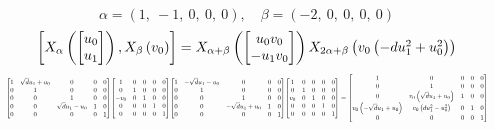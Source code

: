 \documentclass[11pt]{article}
\theoremstyle{definition}
\begin{document}
\[
\alpha = \left( 1, \  -1, \  0, \  0, \  0\right), \quad \beta = \left( -2, \  0, \  0, \  0, \  0\right)
\]
\[
\scaletoalign{\textwidth}{\left[ X_{\alpha}\left(\left[\begin{matrix}u_{0}\\u_{1}\end{matrix}\right]\right), X_{\beta}\left(v_{0}\right) \right] = X_{\alpha + \beta}\left(\left[\begin{matrix}u_{0} v_{0}\\- u_{1} v_{0}\end{matrix}\right]\right) X_{2\alpha + \beta}\left(v_{0} \left(- d u_{1}^{2} + u_{0}^{2}\right)\right)}
\]
\[
\scaletoalign{\textwidth}{{\left[\begin{matrix}1 & \sqrt{d} u_{1} + u_{0} & 0 & 0 & 0\\0 & 1 & 0 & 0 & 0\\0 & 0 & 1 & 0 & 0\\0 & 0 & \sqrt{d} u_{1} - u_{0} & 1 & 0\\0 & 0 & 0 & 0 & 1\end{matrix}\right]} {\left[\begin{matrix}1 & 0 & 0 & 0 & 0\\0 & 1 & 0 & 0 & 0\\- v_{0} & 0 & 1 & 0 & 0\\0 & 0 & 0 & 1 & 0\\0 & 0 & 0 & 0 & 1\end{matrix}\right]} {\left[\begin{matrix}1 & - \sqrt{d} u_{1} - u_{0} & 0 & 0 & 0\\0 & 1 & 0 & 0 & 0\\0 & 0 & 1 & 0 & 0\\0 & 0 & - \sqrt{d} u_{1} + u_{0} & 1 & 0\\0 & 0 & 0 & 0 & 1\end{matrix}\right]} {\left[\begin{matrix}1 & 0 & 0 & 0 & 0\\0 & 1 & 0 & 0 & 0\\v_{0} & 0 & 1 & 0 & 0\\0 & 0 & 0 & 1 & 0\\0 & 0 & 0 & 0 & 1\end{matrix}\right]} = {\left[\begin{matrix}1 & 0 & 0 & 0 & 0\\0 & 1 & 0 & 0 & 0\\0 & v_{0} \left(\sqrt{d} u_{1} + u_{0}\right) & 1 & 0 & 0\\v_{0} \left(- \sqrt{d} u_{1} + u_{0}\right) & v_{0} \left(d u_{1}^{2} - u_{0}^{2}\right) & 0 & 1 & 0\\0 & 0 & 0 & 0 & 1\end{matrix}\right]}}
\]
\end{document}
